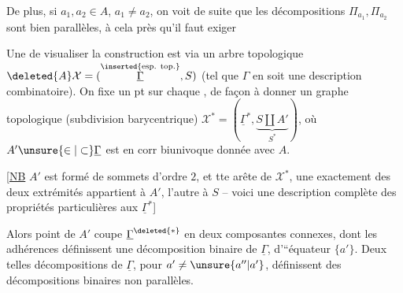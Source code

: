 De plus, si $a_1,a_2\in A$, $a_1\ne a_2$, on voit de suite que les décompositions $\Pi_{a_1},\Pi_{a_2}$ sont bien parallèles, à cela près qu'il faut exiger %

Une  de visualiser la construction est via un arbre topologique $\deleted{A}\mathcal{X}=(\overset{\text{\inserted{esp. top.}}}{\underline{\Gamma}},S)$ (tel que $\Gamma$ en soit une description combinatoire). On fixe un pt sur chaque , de façon à donner un graphe topologique (subdivision barycentrique) $\mathcal{X}^{\ast}=(\underline{\Gamma}^{\ast},\underbrace{S\amalg A'}_{S^{\ast}})$, où $A'\unsure{\in|\subset}\underline{\Gamma}$ est en corr biunivoque donnée avec  $A$.

 [\uline{NB} $A'$ est formé de  sommets d'ordre $2$, et  tte arête de $\mathcal{X}^{\ast}$, une exactement des deux extrémités appartient à $A'$, l'autre à $S$ -- voici une description complète des propriétés particulières aux $\underline{\Gamma}^{\ast}$]

Alors  point  de $A'$ coupe $\underline{\Gamma}^{\deleted{\ast}}$ en deux composantes connexes, dont les adhérences définissent une décomposition binaire de $\underline{\Gamma}$, d'``équateur $\{a'\}$. Deux telles décompositions  de $\underline{\Gamma}$, pour $a'\ne\unsure{a''|a'}$, définissent des décompositions binaires  non parallèles.
